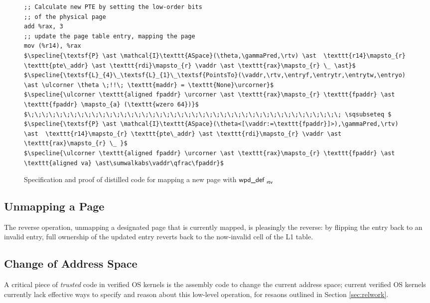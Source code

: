 \begin{figure}
\begin{lstlisting}
;; Calculate new PTE by setting the low-order bits
;; of the physical page
add %rax, 3
;; update the page table entry, mapping the page
mov (%r14), %rax
$\specline{\textsf{P} \ast \mathcal{I}\texttt{ASpace}(\theta,\gammaPred,\rtv) \ast  \texttt{r14}\mapsto_{r} \texttt{pte\_addr} \ast \texttt{rdi}\mapsto_{r} \vaddr \ast \texttt{rax}\mapsto_{r} \_ \ast}$
$\specline{\textsf{L}_{4}\_\textsf{L}_{1}\_\textsf{PointsTo}(\vaddr,\rtv,\entryf,\entrytr,\entrytw,\entryo) \ast \ulcorner \theta \;!!\; \texttt{maddr} = \texttt{None}\urcorner}$
$\specline{\ulcorner \texttt{aligned fpaddr} \urcorner \ast \texttt{rax}\mapsto_{r} \texttt{fpaddr} \ast \texttt{fpaddr} \mapsto_{a} (\texttt{wzero 64})}$
$\;\;\;\;\;\;\;\;\;\;\;\;\;\;\;\;\;\;\;\;\;\;\;\;\;\;\;\;\;\;\;\;\;\;\;\;\;\;\;\;\;\;\;\; \sqsubseteq $
$\specline{\textsf{P} \ast \mathcal{I}\texttt{ASpace}(\theta<[\vaddr:=\texttt{fpaddr}]>),\gammaPred,\rtv) \ast  \texttt{r14}\mapsto_{r} \texttt{pte\_addr} \ast \texttt{rdi}\mapsto_{r} \vaddr \ast \texttt{rax}\mapsto_{r} \_ }$
$\specline{\ulcorner \texttt{aligned fpaddr} \urcorner \ast \texttt{rax}\mapsto_{r} \texttt{fpaddr} \ast \texttt{aligned va} \ast\sumwalkabs\vaddr\qfrac\fpaddr}$
\end{lstlisting}
\caption{Specification and proof of distilled code for mapping a new page with $\textsf{wpd\_def }_{\textsf{rtv}}$}
\label{fig:mapping_code}
\end{figure}


\subsection{Unmapping a Page}
The reverse operation, unmapping a designated page that is currently mapped, is pleasingly the reverse: by flipping the entry back to an invalid entry, full ownership of the updated entry reverts back to the now-invalid cell of the L1 table.

\subsection{Change of Address Space}
A critical piece of \emph{trusted} code in verified OS kernels is the assembly code to change the current address space; current verified OS kernels currently lack effective ways to specify and reason about this low-level operation, for resaons outlined in Section \ref{sec:relwork}.

